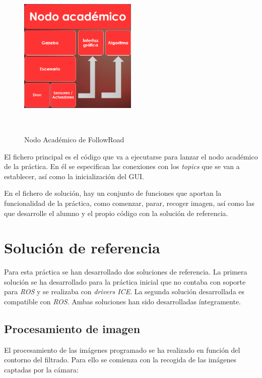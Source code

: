 \begin{figure}[H]
  \begin{center}
    \includegraphics[width=0.5\textwidth, height=8cm]{figures/na_fr.png}
		\caption{Nodo Académico de FollowRoad}
		\label{fig.na_fr}
		\end{center}
\end{figure} 

El fichero principal es el código que va a ejecutarse para lanzar el nodo académico de la práctica. En él se especifican las conexiones con los \textit{topics} que se van a establecer, así como la inicialización del GUI.

En el fichero de solución, hay un conjunto de funciones que aportan la funcionalidad de la práctica, como comenzar, parar, recoger imagen, así como las que desarrolle el alumno y el propio código con la solución de referencia.

\section{Solución de referencia}
Para esta práctica se han desarrollado dos soluciones de referencia. La primera solución se ha desarrollado para la práctica inicial que no contaba con soporte para \textit{ROS} y se realizaba con \textit{drivers ICE}. La segunda solución desarrollada es compatible con \textit{ROS}. Ambas soluciones han sido desarrolladas íntegramente.

\subsection{Procesamiento de imagen}
El procesamiento de las imágenes programado se ha realizado en función del contorno del filtrado. Para ello se comienza con la recogida de las imágenes captadas por la cámara:

